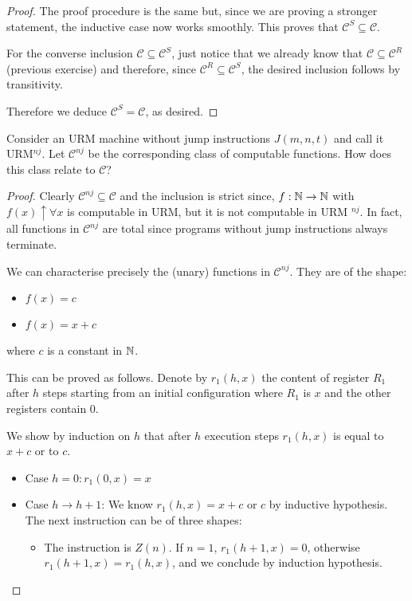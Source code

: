 \begin{exercise}
\begin{proof}
The proof procedure is the same but, since we are proving a stronger
statement, the inductive case now works smoothly. This proves that
$ \mathcal{C}^S \subseteq \mathcal{C} $.

For the converse inclusion $\mathcal{C} \subseteq \mathcal{C}^S$, just notice that we already know that $\mathcal{C} \subseteq \mathcal{C}^R $ (previous exercise) and therefore, since $\mathcal{C}^R \subseteq \mathcal{C}^S$, the desired inclusion follows by transitivity.

Therefore we deduce $\mathcal{C}^S = \mathcal{C}$, as desired.
\end{proof}

\end{exercise}

\begin{exercise}
Consider an URM machine without jump instructions  $J(m,n,t)$ and call it URM$ ^{nj}$. Let $\mathcal{C}^{nj}$ be the corresponding class of computable functions. How does this class relate to $\mathcal{C}$?


\begin{proof}

  Clearly $\mathcal{C}^{nj} \subseteq \mathcal{C}$ and the inclusion is strict since,  $f: \mathbb{N} \rightarrow \mathbb{N}$ with $f(x)\uparrow \forall x$ is computable in URM, but it is not computable in URM $ ^{nj} $.  In fact, all functions in $\mathcal{C}^{nj}$  are total since programs without jump instructions always terminate.

  We can characterise precisely the (unary) functions in $\mathcal{C}^{nj}$. They are of the shape:
\begin{itemize}
  \item $f(x) = c$
  \item $ f(x) = x + c$
\end{itemize}
where $c$ is a constant in $\mathbb{N}$.

This can be proved as follows. Denote by $r_1(h,x) $ the content of register $R_1$ after $h$ steps starting from an initial configuration where $R_1$ is $x$ and the other registers contain $0$.

We show by induction on $h$ that after $h$ execution steps $r_1(h,x) $ is equal to $x + c$ or to $c$.

\begin{itemize}
  \item Case $h = 0: r_1(0,x) = x $

  \item Case $h \rightarrow h+1$: We know $ r_1(h,x) = x+c $ or $ c $ by inductive hypothesis. The next instruction can be of three shapes:
  \begin{itemize}
  \item The instruction is $Z (n)$. If $n = 1$, $r_1(h+1,x) = 0 $, otherwise $r_1(h+1,x) = r_1(h,x)$, and we conclude by induction hypothesis.
    

\end{itemize}
\end{itemize}
\end{proof}
\end{exercise}

